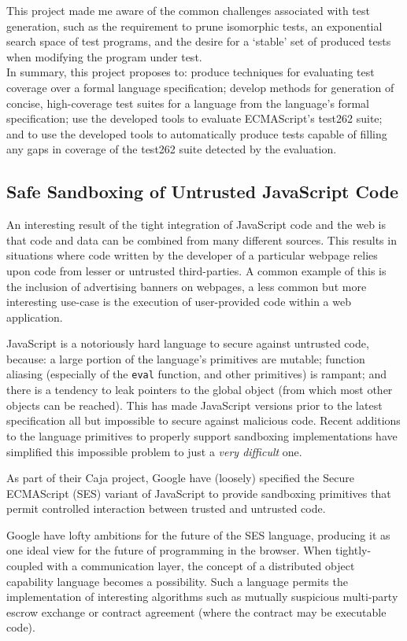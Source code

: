 \documentclass[a4paper]{article}
\begin{document}
This project made me aware of the common challenges associated with test
generation, such as the requirement to prune isomorphic tests, an exponential
search space of test programs, and the desire for a `stable' set of produced
tests when modifying the program under test.
\\

In summary, this project proposes to: produce techniques for evaluating test
coverage over a formal language specification; develop methods for generation of
concise, high-coverage test suites for a language from the language's formal
specification; use the developed tools to evaluate ECMAScript's test262 suite;
and to use the developed tools to automatically produce tests capable of filling
any gaps in coverage of the test262 suite detected by the evaluation.

\subsection{Safe Sandboxing of Untrusted JavaScript Code}
An interesting result of the tight integration of JavaScript code and the web is
that code and data can be combined from many different sources. This results in
situations where code written by the developer of a particular webpage relies
upon code from lesser or untrusted third-parties. A common example of this is
the inclusion of advertising banners on webpages, a less common but more
interesting use-case is the execution of user-provided code within a web
application.

JavaScript is a notoriously hard language to secure against untrusted code,
because: a large portion of the language's primitives are mutable; function aliasing
(especially of the \texttt{eval} function, and other primitives) is rampant; and
there is a tendency
to leak pointers to the global object (from which most other objects can be
reached). This has made JavaScript versions prior to the latest specification
all but impossible to secure against malicious code. Recent additions to the
language primitives to properly support sandboxing implementations have
simplified this impossible problem to just a \emph{very difficult} one.

As part of their Caja project, Google have (loosely) specified the Secure
ECMAScript (SES) variant of JavaScript to provide sandboxing primitives that
permit controlled interaction between trusted and untrusted code.

Google have lofty ambitions for the future of the SES language, producing it as
one ideal view for the future of programming in the browser. When
tightly-coupled with a communication layer, the concept of a distributed object
capability language becomes a possibility. Such a language permits the
implementation of interesting algorithms such as mutually suspicious multi-party
escrow exchange or contract agreement (where the contract may be executable
code).
\end{document}
